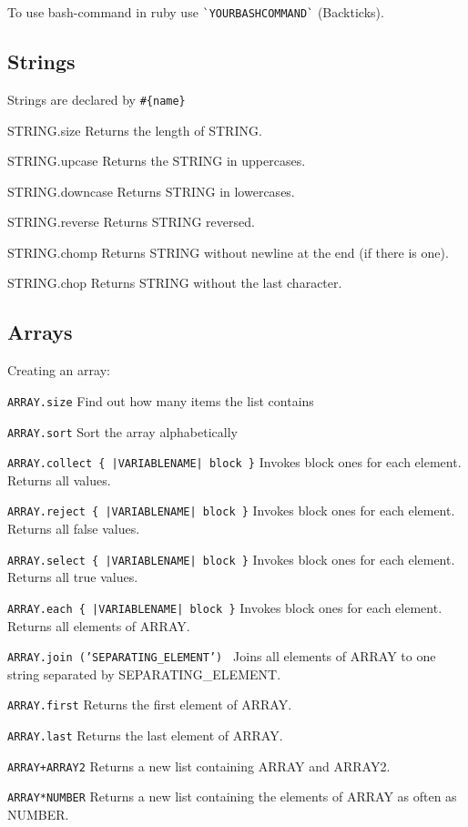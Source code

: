 \documentclass[10pt,a4paper]{scrartcl}
\begin{document}
To use bash-command in ruby use \texttt{\`{}YOURBASHCOMMAND\`} (Backticks).

\subsection{Strings}

Strings are declared by \verb$#{name}$

\begin{description}
	\item{STRING.size} Returns the length of STRING.
	\item{STRING.upcase} Returns the STRING in uppercases.
	\item{STRING.downcase} Returns STRING in lowercases.
	\item{STRING.reverse} Returns STRING reversed.
	\item{STRING.chomp} Returns STRING without newline at the end (if there is one).
	\item{STRING.chop} Returns STRING without the last character.
\end{description}

\subsection{Arrays}
Creating an array:

\begin{terminalcode}
\end{terminalcode}

\begin{description}
\item{\texttt{ARRAY.size}} Find out how many items the list contains
\item{\texttt{ARRAY.sort}} Sort the array alphabetically
\item{\texttt{ARRAY.collect \{ |VARIABLENAME| block \}}} Invokes block ones for each element. Returns all values.
\item{\texttt{ARRAY.reject \{ |VARIABLENAME| block \}}} Invokes block ones for each element. Returns all false values.
\item{\texttt{ARRAY.select \{ |VARIABLENAME| block \}}} Invokes block ones for each element. Returns all true values.
\item{\texttt{ARRAY.each \{ |VARIABLENAME| block \}}} Invokes block ones for each element. Returns all elements of ARRAY.
\item{\texttt{ARRAY.join ('SEPARATING\_ELEMENT')  }} Joins all elements of ARRAY to one string separated by SEPARATING\_ELEMENT.
\item{\texttt{ARRAY.first}} Returns the first element of ARRAY.
\item{\texttt{ARRAY.last}} Returns the last element of ARRAY.
\item{\texttt{ARRAY+ARRAY2}} Returns a new list containing ARRAY and ARRAY2.
\item{\texttt{ARRAY*NUMBER}} Returns a new list containing the elements of ARRAY as often as NUMBER.
\end{description}
\end{document}
